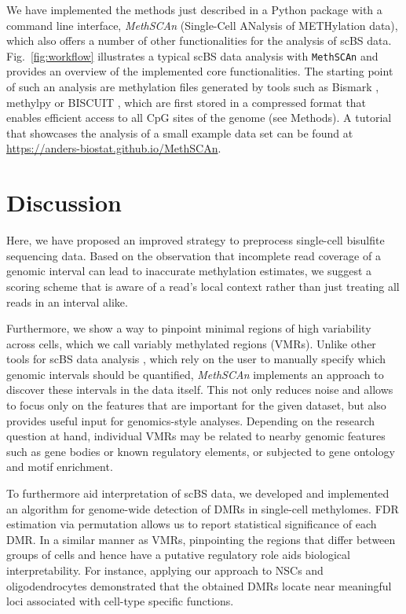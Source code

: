 \documentclass[10pt]{article}
\begin{document}
We have implemented the methods just described in a Python package with a command line interface, \textit{MethSCAn} (Single-Cell ANalysis of METHylation data), which also offers a number of other functionalities for the analysis of scBS data. 
Fig.~\ref{fig:workflow} illustrates a typical scBS data analysis with \texttt{MethSCAn} and provides an overview of the implemented core functionalities.
The starting point of such an analysis are methylation files generated by tools such as Bismark \citep{bismark}, methylpy \citep{methylpy} or BISCUIT \citep{biscuit}, which are first stored in a compressed format that enables efficient access to all CpG sites of the genome (see Methods).
A tutorial that showcases the analysis of a small example data set can be found at \url{https://anders-biostat.github.io/MethSCAn}.


\section*{Discussion}

Here, we have proposed an improved strategy to preprocess single-cell bisulfite sequencing data.
Based on the observation that incomplete read coverage of a genomic interval can lead to inaccurate methylation estimates, we suggest a scoring scheme that is aware of a read's local context rather than just treating all reads in an interval alike. 

Furthermore, we show a way to pinpoint minimal regions of high variability across cells, which we call variably methylated regions (VMRs).
Unlike other tools for scBS data analysis \citep{kapourani2019melissa, kapourani2021scmet, danese2021episcanpy}, which rely on the user to manually specify which genomic intervals should be quantified, \textit{MethSCAn} implements an approach to discover these intervals in the data itself. This not only reduces noise and allows to focus only on the features that are important for the given dataset, but also provides useful input for genomics-style analyses.
Depending on the research question at hand, individual VMRs may be related to nearby genomic features such as gene bodies or known regulatory elements, or subjected to gene ontology and motif enrichment.

To furthermore aid interpretation of scBS data, we developed and implemented an algorithm for genome-wide detection of DMRs in single-cell methylomes.
FDR estimation via permutation allows us to report statistical significance of each DMR.
In a similar manner as VMRs, pinpointing the regions that differ between groups of cells and hence have a putative regulatory role aids biological interpretability.
For instance, applying our approach to NSCs and oligodendrocytes demonstrated that the obtained DMRs locate near meaningful loci associated with cell-type specific functions.
\end{document}
